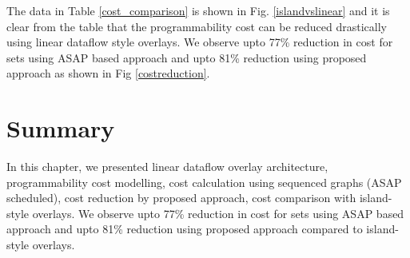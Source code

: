 The data in Table \ref{cost_comparison} is shown in Fig. \ref{islandvslinear} and it is clear from the table that the programmability cost can be reduced drastically using linear dataflow style overlays.
We observe upto 77\% reduction in cost for sets using ASAP based approach and upto 81\% reduction using proposed approach as shown in Fig \ref{costreduction}.




\section{Summary}
In this chapter, we presented linear dataflow overlay architecture, programmability cost modelling, cost calculation using sequenced graphs (ASAP scheduled), cost reduction by proposed approach, cost comparison with island-style overlays.
We observe upto 77\% reduction in cost for sets using ASAP based approach and upto 81\% reduction using proposed approach compared to island-style overlays.


%
%
%
%
%
%
%
%
%
%
%

